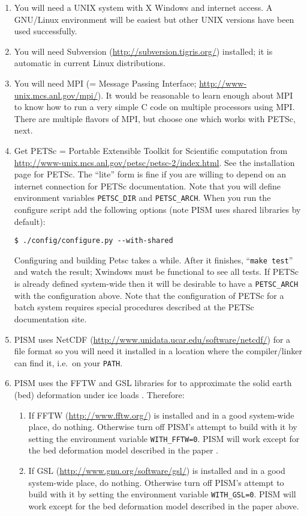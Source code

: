\documentclass[11pt,final]{amsart}
\begin{document}
\renewcommand{\labelenumi}{\arabic{enumi}.~}
\begin{enumerate}
\item You will need a UNIX system with X Windows and internet access.  A GNU/Linux environment will be easiest but other UNIX versions have been used successfully.
\item You will need Subversion (\url{http://subversion.tigris.org/}) installed; it is automatic in current Linux distributions.
\item You will need MPI (= Message Passing Interface; \url{http://www-unix.mcs.anl.gov/mpi/}).  It would be reasonable to learn enough about MPI to know how to run a very simple C code on multiple processors using MPI.  There are multiple flavors of MPI, but choose one which works with PETSc, next.
\item Get PETSc = Portable Extensible Toolkit for Scientific computation from \url{http://www-unix.mcs.anl.gov/petsc/petsc-2/index.html}.
See the installation page for PETSc.  The ``lite'' form is fine if you are willing to depend on an internet connection for PETSc documentation.  Note that you will define environment variables \verb|PETSC_DIR| and \verb|PETSC_ARCH|.  When you run the configure script add the following options (note PISM uses shared libraries by default):

\verb|$ ./config/configure.py --with-shared|

\noindent Configuring and building Petsc takes a while.  After it finishes, ``\verb|make test|'' and watch the
result; Xwindows must be functional to see all tests.  If PETSc is already defined system-wide then it will be desirable to have a \verb|PETSC_ARCH| with the configuration above.  Note that the configuration of PETSc for a batch system requires special procedures described at the PETSc documentation site.
\item PISM uses NetCDF (\url{http://www.unidata.ucar.edu/software/netcdf/}) for a file format so you will need it installed in a location where the compiler/linker can find it, i.e.~on your \verb|PATH|.
\item PISM uses the FFTW and GSL libraries for to approximate the solid earth (bed) deformation under ice loads \cite{BLKfastearth}.  Therefore:
\renewcommand{\labelenumii}{(\roman{enumii})}\begin{enumerate}
\item If FFTW (\url{http://www.fftw.org/}) is installed and in a good system-wide place, do nothing.  Otherwise turn off PISM's attempt to build with it by setting the environment variable \verb|WITH_FFTW=0|.  PISM will work except for the bed deformation model described in the paper \cite{BLKfastearth}.
\item If GSL (\url{http://www.gnu.org/software/gsl/}) is installed and in a good system-wide place, do nothing.  Otherwise turn off PISM's attempt to build with it by setting the environment variable \verb|WITH_GSL=0|.  PISM will work except for the bed deformation model described in the paper above.\end{enumerate}


\end{enumerate}
\end{document}
